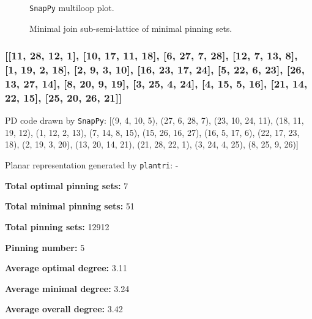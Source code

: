 \documentclass{article}%
\begin{document}
\begin{multicols}{2}
\begin{figure}[H]
\centering

\caption{\texttt{SnapPy} multiloop plot.}
\label{fig:tex/img/[[24, 28, 1, 25], [25, 11, 26, 12], [16, 23, 17, 24], [9, 27, 10, 28], [1, 10, 2, 11], [26, 2, 27, 3], [12, 19, 13, 20], [6, 15, 7, 16], [7, 22, 8, 23], [17, 8, 18, 9], [3, 18, 4, 19], [13, 4, 14, 5],.svg}
\end{figure}
\columnbreak

\begin{figure}[H]
\centering
\scalebox{0.8}{}
\caption{Minimal join sub-semi-lattice of minimal pinning sets.}
\label{fig:tex/img/[[24, 28, 1, 25], [25, 11, 26, 12], [16, 23, 17, 24], [9, 27, 10, 28], [1, 10, 2, 11], [26, 2, 27, 3], [12, 19, 13, 20], [6, 15, 7, 16], [7, 22, 8, 23], [17, 8, 18, 9], [3, 18, 4, 19], [13, 4, 14, 5],.pgf}
\end{figure}
\end{multicols}

\newpage

\subsubsection{[[11, 28, 12, 1], [10, 17, 11, 18], [6, 27, 7, 28], [12, 7, 13, 8], [1, 19, 2, 18], [2, 9, 3, 10], [16, 23, 17, 24], [5, 22, 6, 23], [26, 13, 27, 14], [8, 20, 9, 19], [3, 25, 4, 24], [4, 15, 5, 16], [21, 14, 22, 15], [25, 20, 26, 21]]}

{\small\noindent PD code drawn by \texttt{SnapPy}: [(9, 4, 10, 5), (27, 6, 28, 7), (23, 10, 24, 11), (18, 11, 19, 12), (1, 12, 2, 13), (7, 14, 8, 15), (15, 26, 16, 27), (16, 5, 17, 6), (22, 17, 23, 18), (2, 19, 3, 20), (13, 20, 14, 21), (21, 28, 22, 1), (3, 24, 4, 25), (8, 25, 9, 26)]}

{\small\noindent Planar representation generated by \texttt{plantri}: -}

\begin{multicols}{2}
{\normalsize \noindent\textbf{Total optimal pinning sets:} 7

\noindent\textbf{Total minimal pinning sets:} 51

\noindent\textbf{Total pinning sets:} 12912

\noindent\textbf{Pinning number:} 5

}
\columnbreak

{\normalsize \noindent\textbf{Average optimal degree:} 3.11

\noindent\textbf{Average minimal degree:} 3.24

\noindent\textbf{Average overall degree:} 3.42

}
\end{multicols}
\end{document}
